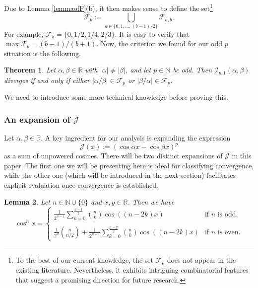 \documentclass[12pt, reqno]{amsart}
\theoremstyle{plain}
\newtheorem{theorem}{Theorem}[section]
\newtheorem{lemma}[theorem]{Lemma}
\theoremstyle{definition}
\begin{document}
Due to Lemma \ref{lemmaofF}(b), it then makes sense to define the set\footnote{To the best of our current knowledge, the set $\mathcal{F}_p$ does not appear in the existing literature. Nevertheless, it exhibits intriguing combinatorial features that suggest a promising direction for future research.}
\[\mathcal{F}_{b}:=\bigcup_{a\in\{0, 1, \ldots, (b-1)/2\}}\mathcal{F}_{a, b}.\]
For example, $\mathcal{F}_5=\{0, 1/2, 1/4, 2/3\}$. It is easy to verify that $\max\mathcal{F}_b=(b-1)/(b+1)$. Now, the criterion we found for our odd $p$ situation is the following.

\begin{theorem}\label{p=1,oddp}
    Let $\alpha, \beta\in\mathbb{R}$ with $|\alpha|\ne|\beta|$, and let $p\in\mathbb{N}$ be odd.  Then
		$\mathcal{I}_{p,1}(\alpha,\beta)$ diverges if and only if either $\lvert\alpha/\beta\rvert\in\mathcal{F}_p$ or $\lvert\beta/\alpha\rvert\in\mathcal{F}_p$.
\end{theorem}

We need to introduce some more technical knowledge before proving this.


\subsubsection{An expansion of $\mathcal{J}$}\label{sec3.2.2}

Let $\alpha, \beta\in\mathbb{R}$. A key ingredient for our analysis is expanding the expression
\[\mathcal{J}(x):=(\cos \alpha x-\cos \beta x)^p\]
as a sum of unpowered cosines. There will be two distinct expansions of $\mathcal{J}$ in this paper. The first one we will be presenting here is ideal for classifying convergence, while the other one (which will be introduced in the next section) facilitates explicit evaluation once convergence is established.

\begin{lemma}\cite{II}
    Let $n\in\mathbb{N}\cup\{0\}$ and $x, y\in\mathbb{R}$. Then we have
    \[\cos^nx=\begin{cases}
				\displaystyle\frac{1}{2^{n-1}}\sum_{k=0}^{\frac{n-1}{2}}{n\choose k}\cos((n-2k)x)&\text{if }n\text{ is odd,}\\\\
				\displaystyle\frac{1}{2^n}{n\choose n/2}+\frac{1}{2^{n-1}}\sum_{k=0}^{\frac{n-2}{2}}{n\choose k}\cos((n-2k)x)&\text{if }n\text{ is even.}
			\end{cases}\]
\end{lemma}
\end{document}
